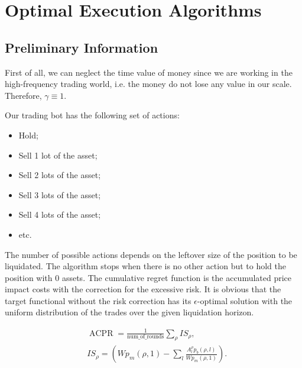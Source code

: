 \section{Optimal Execution Algorithms}
    \subsection{Preliminary Information}
        First of all, we can neglect the time value of money since we are working in the high-frequency
        trading world, i.e. the money do not lose any value in our scale. Therefore, $\gamma \equiv 1$.

        Our trading bot has the following set of actions:
        \begin{itemize}
            \item Hold;
            \item Sell 1 lot of the asset;
            \item Sell 2 lots of the asset;
            \item Sell 3 lots of the asset;
            \item Sell 4 lots of the asset;
            \item etc.
        \end{itemize}
        The number of possible actions depends on the leftover size of the position to be liquidated.
        The algorithm stops when there is no other action but to hold the position with 0 assets. 
        The cumulative regret function is the accumulated price impact costs with the correction for the excessive risk.
        It is obvious that the target functional without the risk correction has its $\epsilon$-optimal 
        solution with the uniform distribution of the trades over the given liquidation horizon.

        \begin{definition}
            \begin{align}
                & \operatorname*{ACPR} = \frac{1}{\operatorname{num\_of\_rounds}} \sum_\rho IS_\rho,\\
                & IS_\rho = \left( W  p_m(\rho, 1) - \sum_l \frac{A^\rho_l p_b(\rho, l)}{W p_m(\rho, 1)}\right).
            \end{align}
        \end{definition}


